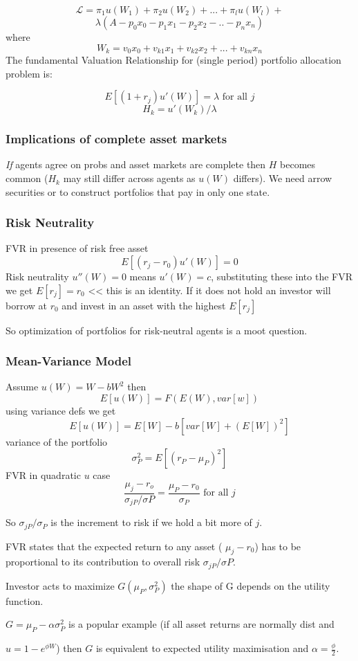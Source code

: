 \documentclass[a4paper,12pt]{article}
\begin{document}
\begin{multicols}{2}
\[\mathcal{L}=\pi_1u(W_1)+\pi_2u(W_2)+...+\pi_lu(W_l)+\]
\[\lambda(A-p_0x_0-p_1x_1-p_2x_2-..-p_nx_n)\]
where
\[W_k=v_0x_0+v_{k1}x_1+v_{k2}x_2+...+v_{kn}x_n\]
The fundamental Valuation Relationship for (single period) portfolio allocation
problem is:

\[E[(1+r_j)u'(W)]=\lambda \mbox{ for all } j\]
\[H_k=u'(W_k)/\lambda\]
\subsubsection*{Implications of complete asset markets}
\emph{If} agents agree on probs and asset markets are complete then $H$ becomes
common ($H_k$ may still differ across agents as $u(W)$ differs). We need arrow
securities or to construct portfolios that pay in only one state.

\subsubsection*{Risk Neutrality}
FVR in presence of risk free asset
\[E[(r_j-r_0)u'(W)]=0\]
Risk neutrality $u''(W)=0$ means $u'(W)=c$, substituting these into the FVR we
get $E[r_j]=r_0$ << this is an identity. If it does not hold an investor will
borrow at $r_0$ and invest in an asset with the highest $E[r_j]$

So optimization of portfolios for risk-neutral agents is a moot question.

\subsubsection*{Mean-Variance Model}
Assume $u(W)=W-bW^2$ then
\[E[u(W)]=F(E(W),var[w])\]
using variance defs we get 
\[E[u(W)]=E[W]-b[var[W]+(E[W])^2]\]
variance of the portfolio
\[\sigma^2_P=E[(r_P-\mu_P)^2]\]
FVR in quadratic $u$ case
\[\frac{\mu_j-r_o}{\sigma_{jP}/\sigma{P}}=\frac{\mu_P-r_0}{\sigma_P}\mbox{ for
all } j\]

So $\sigma_{jP}/\sigma_P$ is the increment to risk if we hold a bit more of
$j$.

FVR states that the expected return to any asset ( $\mu_j - r_0$) has to be
proportional to its contribution to overall risk $\sigma_{jP}/\sigma{P}$.

Investor acts to maximize $G(\mu_P,\sigma^2_P)$ the shape of G depends on the
utility function. 

$G=\mu_P-\alpha \sigma^2_P$ is a popular example (if all asset returns are
normally dist and 

$u=1-e^{\phi W}$) then $G$ is equivalent to expected utility maximisation and
$\alpha=\frac{\phi}{2}$. 


\end{multicols}
\end{document}
